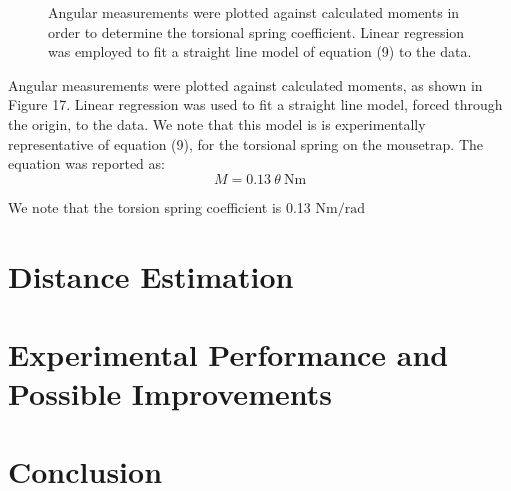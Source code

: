 \documentclass[a4paper]{article}
\begin{document}
\begin{figure}[h]
	\centering
	\caption{Angular measurements were plotted against calculated moments in order to determine the torsional spring coefficient. Linear regression was employed to fit a straight line model of equation (9) to the data.}
\end{figure}

Angular measurements were plotted against calculated moments, as shown in Figure 17. Linear regression was used to fit a straight line model, forced through the origin, to the data. We note that this model is is experimentally representative of equation (9), for the torsional spring on the mousetrap. The equation was reported as:
\begin{equation}
	M = 0.13 \ \theta \ \si{\newton\meter}
\end{equation}

We note that the torsion spring coefficient is 0.13 $\si{\newton\meter\per\radian}$

\section{Distance Estimation}

\section{Experimental Performance and Possible Improvements}

\section{Conclusion}



\end{document}
